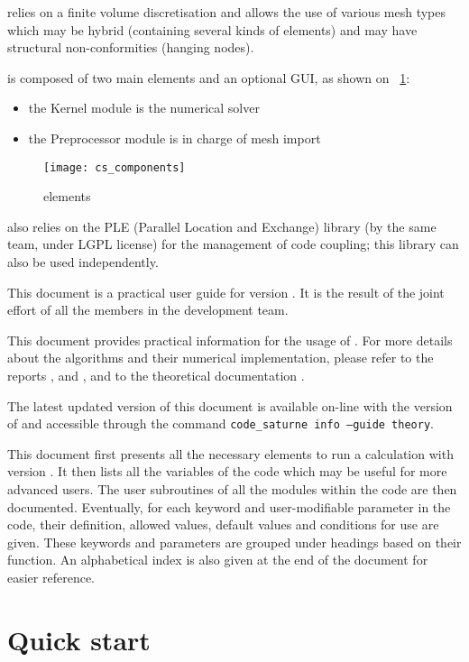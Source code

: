 \CS relies on a finite volume discretisation and allows the use of
various mesh types which may be hybrid (containing several kinds of
elements) and may have structural non-conformities (hanging nodes).


\CS is composed of two main elements and an optional GUI,
as shown on \figurename~\ref{fig:elements}:
\begin{itemize}
\item the Kernel module is the numerical solver
\item the Preprocessor module is in charge of mesh import\\
\end{itemize}

\begin{figure}[!h]
\centerline{
\texttt{[image: cs\_components]}}
\caption{\CS elements}\label{fig:elements}
\end{figure}

\indent\CS also relies on the PLE (Parallel Location and Exchange) library (by
the same team, under LGPL license) for the management of code coupling;
this library can also be used independently.

This document is a practical user guide for \CS version \verscs.
It is the result of the joint effort of
all the members in the development team.

This document provides practical information for the usage of \CS.
For more details about the algorithms and their numerical implementation,
please refer to the reports
 \cite{ijvf}, \cite{boucker00} and \cite{mechitoua98},
and to the theoretical documentation \cite{theory}.

The latest updated version of this document is available on-line with the version of \CS
and accessible through the command
\texttt{code\_saturne info --guide theory}.

This document first
presents all the necessary elements to run a calculation
with \CS version \verscs. It then lists all the variables of the code
which may be useful for more advanced users.
The user subroutines of all the modules within the code are then documented.
Eventually, for each keyword and user-modifiable parameter in the code,
their definition, allowed values, default values and conditions for use are given.
These keywords and parameters are grouped under headings
based on their function. An alphabetical index is also given at the end of
the document for easier reference.

\section{Quick start}
